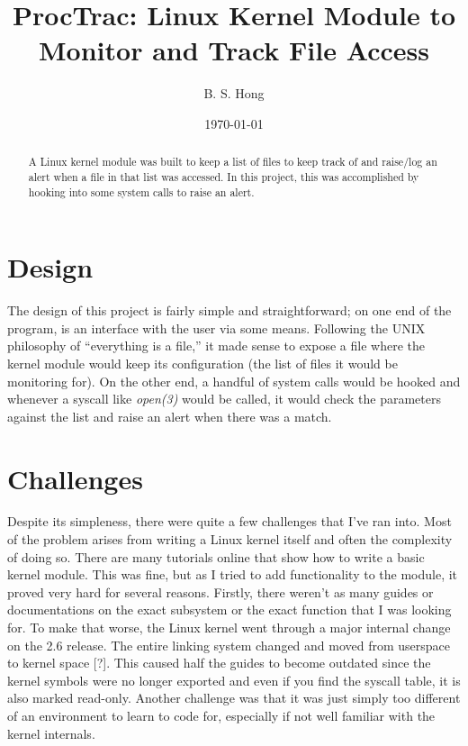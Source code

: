 \documentclass[letterpaper,12pt]{article}
\begin{document}
\title{ProcTrac: Linux Kernel Module to Monitor and Track File Access}
\author{B. S. Hong}
\date{\today}
\maketitle

\begin{abstract}
A Linux kernel module was built to keep a list of files to keep track of and raise/log an alert when a file in that list was accessed. In this project, this was accomplished by hooking into some system calls to raise an alert.
\end{abstract}


\section{Design}

The design of this project is fairly simple and straightforward; on one end of the program, is an interface with the user via some means. Following the UNIX philosophy of ``everything is a file,'' it made sense to expose a file where the kernel module would keep its configuration (the list of files it would be monitoring for). On the other end, a handful of system calls would be hooked and whenever a syscall like \textit{open(3)} would be called, it would check the parameters against the list and raise an alert when there was a match.

\section{Challenges}

Despite its simpleness, there were quite a few challenges that I've ran into. Most of the problem arises from writing a Linux kernel itself and often the complexity of doing so. There are many tutorials online that show how to write a basic kernel module. This was fine, but as I tried to add functionality to the module, it proved very hard for several reasons. Firstly, there weren't as many guides or documentations on the exact subsystem or the exact function that I was looking for. To make that worse, the Linux kernel went through a major internal change on the 2.6 release. The entire linking system changed and moved from userspace to kernel space [?]. This caused half the guides to become outdated since the kernel symbols were no longer exported and even if you find the syscall table, it is also marked read-only. Another challenge was that it was just simply too different of an environment to learn to code for, especially if not well familiar with the kernel internals.
\end{document}
